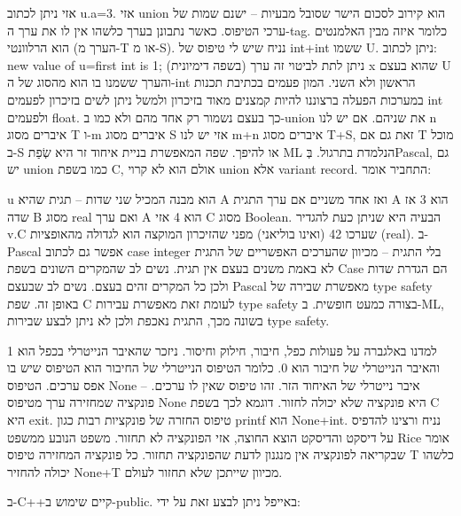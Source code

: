      אזי ניתן לכתוב u.a=3. אזי union הוא קירוב לסכום הישר שסובל מבעיות – ישנם שמות של ערכי הטיפוס. כאשר נתבונן בערך כלשהו אין לו את ערך ה-tag. כלומר איזה מבין האלמנטים הוא הרלוונטי (הערך מ-T או מ-S).
      נניח שיש לי טיפוס של int+int ששמו U. ניתן לכתוב:
      new value of u=first int is 1; (בשפה דימיונית)
      ניתן לתת לביטוי זה ערך x שהוא בעצם U והערך ששמנו בו הוא מהסוג של ה-int הראשון ולא השני. המון פעמים בכתיבת תכנות במערכות הפעלה ברצוננו להיות קמצנים מאוד בזיכרון ולמשל ניתן לשים בזיכרון לפעמים int ולפעמים float. כך בעצם נשמור רק אחד מהם ולא כמו ב-union את שניהם.
      אם יש לנו n איברים מסוג T ו-m איברים מסוג S אזי יש לנו m+n איברים מסוג T+S, זאת גם אם T מוכל ב-S או להיפך. שפה המאפשרת בניית איחוד זר היא שְׂפַת ML הנלמדת בתרגול.
      בְּPascal, גם יש union כמו בשפת C, אולם הוא לא קרוי union אלא variant record. התחביר אומר:

      u הוא מבנה המכיל שני שדות – תגית שהיא A ואז אחד משניים אם ערך התגית A הוא 3 אז שדה B מסוג real ואם ערך A הוא 4 אזי C מסוג Boolean.
      הבעיה היא שניתן כעת להגדיר v.C שערכו 42 (ואינו בוליאני) מפני שהזיכרון המוקצה הוא לגדולה מהאופציות (real).
      ב-Pascal אפשר גם לכתוב case integer בלי התגית – מכיוון שהערכים האפשריים של התגית לא באמת משנים בעצם אין תגית. נשים לב שהמקרים השונים בשפת Case הם הגדרת שדות ולכן כל המקרים זהים בעצם. נשים לב שבעצם Pascal מאפשרת שבירה של type safety באופן זה.
      שפת C לעומת זאת מאפשרת עבירות type safety בצורה כמעט חופשית.
      ב-ML, בשונה מכך, התגית נאכפת ולכן לא ניתן לבצע שבירות type safety.

      למדנו באלגברה על פעולות כפל, חיבור, חילוק וחיסור. ניזכר שהאיבר הנייטרלי בכפל הוא 1 והאיבר הנייטרלי של חיבור הוא 0. כלומר הטיפוס הנייטרלי של החיבור הוא הטיפוס שיש בו אפס ערכים.
      הטיפוס None – איבר נייטרלי של האיחוד הזר. זהו טיפוס שאין לו ערכים. פונקציה שמחזירה ערך מטיפוס None היא פונקציה שלא יכולה לחזור. דוגמא לכך בשפת C היא exit.
      טיפוס החזרה של פונקציות רבות כגון printf הוא None+int. נניח ורצינו להדפיס על דיסקט והדיסקט הוצא החוצה, אזי הפונקציה לא תחזור.
      משפט הנובע ממשפט Rice אומר שבקריאה לפונקציה אין מנגנון לדעת שהפונקציה תחזור. כל פונקציה המחזירה טיפוס T כלשהו יכולה להחזיר None+T מכיוון שייתכן שלא תחזור לעולם.

      ב-C++קיים שימוש ב-public.
      באייפל ניתן לבצע זאת על ידי:

